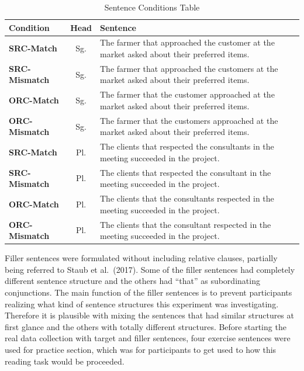 \documentclass[
]{article}
\begin{document}
\vspace{1em}

\begingroup\fontsize{9.5}{11.5}\selectfont

\begin{longtable}[t]{>{}lcl}
\caption{\label{tab:Table4_Sentence_Condition}{\fontsize{11}{13}\selectfont Sentence Conditions Table}}\\
\toprule
\textbf{Condition} & \textbf{Head} & \textbf{Sentence}\\
\midrule
\textbf{SRC-Match} & Sg. & The farmer that approached the customer at the market asked about their preferred items.\\
\textbf{SRC-Mismatch} & Sg. & The farmer that approached the customers at the market asked about their preferred items.\\
\textbf{ORC-Match} & Sg. & The farmer that the customer approached at the market asked about their preferred items.\\
\textbf{ORC-Mismatch} & Sg. & The farmer that the customers approached at the market asked about their preferred items.\\
\textbf{SRC-Match} & Pl. & The clients that respected the consultants in the meeting succeeded in the project.\\
\addlinespace
\textbf{SRC-Mismatch} & Pl. & The clients that respected the consultant in the meeting succeeded in the project.\\
\textbf{ORC-Match} & Pl. & The clients that the consultants respected in the meeting succeeded in the project.\\
\textbf{ORC-Mismatch} & Pl. & The clients that the consultant respected in the meeting succeeded in the project.\\
\bottomrule
\end{longtable}
\endgroup{}

\vspace{1em}

Filler sentences were formulated without including relative clauses,
partially being referred to Staub et al.~(2017). Some of the filler
sentences had completely different sentence structure and the others had
``that'' as subordinating conjunctions. The main function of the filler
sentences is to prevent participants realizing what kind of sentence
structures this experiment was investigating. Therefore it is plausible
with mixing the sentences that had similar structures at first glance
and the others with totally different structures. Before starting the
real data collection with target and filler sentences, four exercise
sentences were used for practice section, which was for participants to
get used to how this reading task would be proceeded.　
\end{document}
